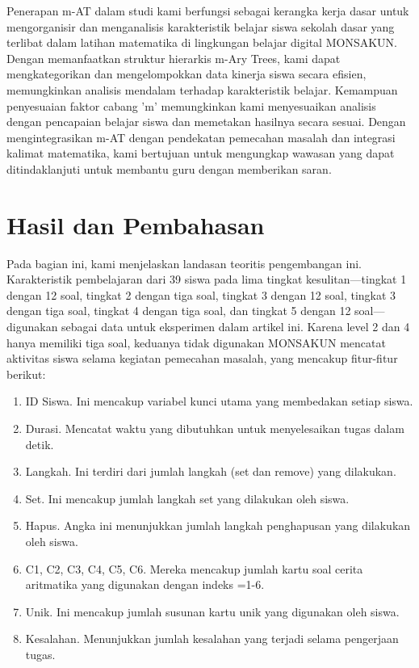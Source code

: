     Penerapan m-AT dalam studi kami berfungsi sebagai kerangka kerja dasar untuk mengorganisir dan menganalisis karakteristik belajar siswa sekolah dasar yang terlibat dalam latihan matematika di lingkungan belajar digital MONSAKUN. Dengan memanfaatkan struktur hierarkis m-Ary Trees, kami dapat mengkategorikan dan mengelompokkan data kinerja siswa secara efisien, memungkinkan analisis mendalam terhadap karakteristik belajar. Kemampuan penyesuaian faktor cabang 'm' memungkinkan kami menyesuaikan analisis dengan pencapaian belajar siswa dan memetakan hasilnya secara sesuai. Dengan mengintegrasikan m-AT dengan pendekatan pemecahan masalah dan integrasi kalimat matematika, kami bertujuan untuk mengungkap wawasan yang dapat ditindaklanjuti untuk membantu guru dengan memberikan saran.

\section{Hasil dan Pembahasan}

    Pada bagian ini, kami menjelaskan landasan teoritis pengembangan ini. Karakteristik pembelajaran dari 39 siswa pada lima tingkat kesulitan—tingkat 1 dengan 12 soal, tingkat 2 dengan tiga soal, tingkat 3 dengan 12 soal, tingkat 3 dengan tiga soal, tingkat 4 dengan tiga soal, dan tingkat 5 dengan 12 soal— digunakan sebagai data untuk eksperimen dalam artikel ini. Karena level 2 dan 4 hanya memiliki tiga soal, keduanya tidak digunakan \citep{Hirashima2014} MONSAKUN mencatat aktivitas siswa selama kegiatan pemecahan masalah, yang mencakup fitur-fitur berikut:

    \begin{enumerate}
        \item ID Siswa. Ini mencakup variabel kunci utama yang membedakan setiap siswa.
        \item Durasi. Mencatat waktu yang dibutuhkan untuk menyelesaikan tugas dalam detik.
        \item Langkah. Ini terdiri dari jumlah langkah (set dan remove) yang dilakukan.
        \item Set. Ini mencakup jumlah langkah set yang dilakukan oleh siswa.
        \item Hapus. Angka ini menunjukkan jumlah langkah penghapusan yang dilakukan oleh siswa.
        \item C1, C2, C3, C4, C5, C6. Mereka mencakup jumlah kartu soal cerita aritmatika yang digunakan dengan indeks =1-6.
        \item Unik. Ini mencakup jumlah susunan kartu unik yang digunakan oleh siswa.
        \item Kesalahan. Menunjukkan jumlah kesalahan yang terjadi selama pengerjaan tugas.
    \end{enumerate}

